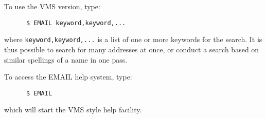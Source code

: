 To use the VMS version, type:

\begin{verbatim}
      $ EMAIL keyword,keyword,...
\end{verbatim}

where \verb+keyword,keyword,...+ is a list of one or more
keywords for the search. It is thus possible to search for many
addresses at once, or conduct a search based on similar spellings of a
name in one pass.

To access the EMAIL help system, type:

\begin{verbatim}
      $ EMAIL
\end{verbatim}

which will start the VMS style help facility.



